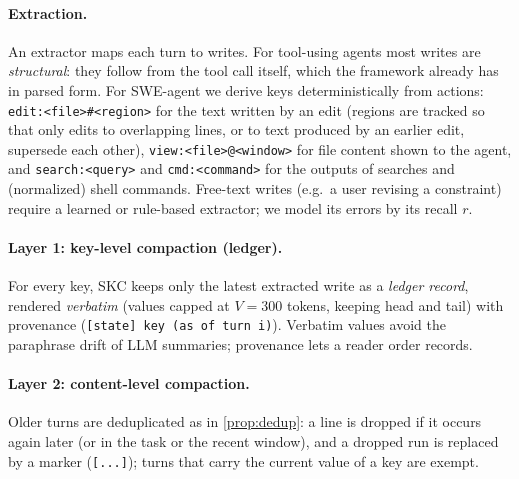 \paragraph{Extraction.} An extractor maps each turn to writes. For tool-using
agents most writes are \emph{structural}: they follow from the tool call itself,
which the framework already has in parsed form. For SWE-agent we derive keys
deterministically from actions: \texttt{edit:<file>\#<region>} for the text
written by an edit (regions are tracked so that only edits to overlapping lines,
or to text produced by an earlier edit, supersede each other),
\texttt{view:<file>@<window>} for file content shown to the agent, and
\texttt{search:<query>} and \texttt{cmd:<command>} for the outputs of searches
and (normalized) shell commands. Free-text writes (e.g.\ a user revising a
constraint) require a learned or rule-based extractor; we model its errors by its
recall $r$.

\paragraph{Layer 1: key-level compaction (ledger).} For every key, SKC keeps
only the latest extracted write as a \emph{ledger record}, rendered
\emph{verbatim} (values capped at $V{=}300$ tokens, keeping head and tail) with
provenance (\texttt{[state] key (as of turn i)}). Verbatim values avoid the
paraphrase drift of LLM summaries; provenance lets a reader order records.

\paragraph{Layer 2: content-level compaction.} Older turns are deduplicated as
in \cref{prop:dedup}: a line is dropped if it occurs again later (or in the task
or the recent window), and a dropped run is replaced by a marker
(\texttt{[...]}); turns that carry the current value of a key are exempt.

